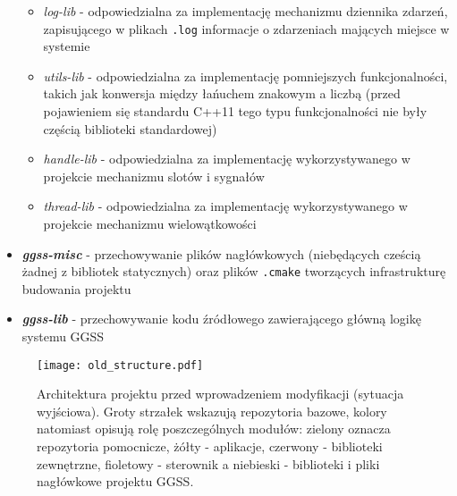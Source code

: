 \begin{itemize}
    \begin{itemize}
        \item \emph{log-lib} - odpowiedzialna za implementację mechanizmu dziennika zdarzeń, zapisującego w plikach \lstinline{.log} informacje o zdarzeniach mających miejsce w systemie
        \item \emph{utils-lib} - odpowiedzialna za implementację pomniejszych funkcjonalności, takich jak konwersja między łańuchem znakowym a liczbą (przed pojawieniem się standardu C++11 tego typu funkcjonalności nie były częścią biblioteki standardowej)
        \item \emph{handle-lib} - odpowiedzialna za implementację wykorzystywanego w projekcie mechanizmu slotów i sygnałów
        \item \emph{thread-lib} - odpowiedzialna za implementację wykorzystywanego w projekcie mechanizmu wielowątkowości
    \end{itemize}
    \item \textbf{\emph{ggss-misc}} - przechowywanie plików nagłówkowych (niebędących cześcią żadnej z bibliotek statycznych) oraz plików \lstinline{.cmake} tworzących infrastrukturę budowania projektu
    \item \textbf{\emph{ggss-lib}} - przechowywanie kodu źródłowego zawierającego główną logikę systemu GGSS
\end{itemize}

\begin{landscape}

\begin{figure}
\centering
\texttt{[image: old\_structure.pdf]}
\caption{Architektura projektu przed wprowadzeniem modyfikacji (sytuacja wyjściowa). Groty strzałek wskazują repozytoria bazowe, kolory natomiast opisują rolę poszczególnych modułów: zielony oznacza repozytoria pomocnicze, żółty - aplikacje, czerwony - biblioteki zewnętrzne, fioletowy - sterownik a niebieski - biblioteki i pliki nagłówkowe projektu GGSS.}
\label{fig:old_structure}
\end{figure}

\end{landscape}

